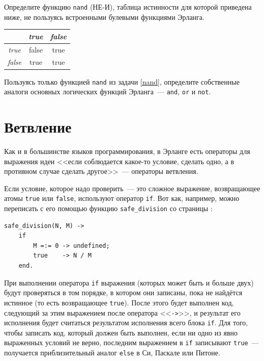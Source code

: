 \documentclass[
  paper=a4,
  fontsize=14pt,
  openany,
  appendixprefix=true
]{scrbook}
\begin{document}
\begin{problem}\label{nand}
Определите функцию \lstinline{nand} (НЕ-И), таблица истинности для которой приведена ниже, не пользуясь встроенными булевыми функциями Эрланга.

\begin{tabular}{|c|c|c|}
\hline
      & \emph{true}  & \emph{false} \\
\hline
\emph{true}  & false & true  \\
\hline
\emph{false} & true  & true  \\
\hline
\end{tabular}
\end{problem}

\begin{problem}\label{myor}
\complicated Пользуясь только функцией \lstinline{nand} из задачи \ref{nand}, определите собственные аналоги основных логических функций Эрланга~--- \lstinline{and}, \lstinline{or} и \lstinline{not}.
\end{problem}

\section{Ветвление}

Как и в большинстве языков программирования, в Эрланге есть операторы для выражения идеи <<если соблюдается какое-то условие, сделать одно, а в противном случае сделать другое>>~--- операторы ветвления.

Если условие, которое надо проверить~--- это сложное выражение, возвращающее атомы \lstinline{true} или \lstinline{false}, используют оператор \lstinline{if}. Вот как, например, можно переписать с его помощью функцию \lstinline{safe_division} со страницы \pageref{safe_division}:

\label{if}
\begin{lstlisting}
safe_division(N, M) ->
    if
        M =:= 0 -> undefined;
        true    -> N / M
    end.
\end{lstlisting}

При выполнении оператора \lstinline{if} выражения (которых может быть и больше двух) будут проверяться в том порядке, в котором они записаны, пока не найдётся истинное (то есть возвращающее \lstinline{true}). После этого будет выполнен код, следующий за этим выражением после оператора <<\lstinline{->}>>, и результат его исполнения будет считаться результатом исполнения всего блока \lstinline{if}. Для того, чтобы записать код, который должен быть выполнен, если ни одно из явно выраженных условий не верно, последним выражением в \lstinline{if} записывают \lstinline{true}~--- получается приблизительный аналог \lstinline{else} в Си, Паскале или Питоне.
\end{document}
